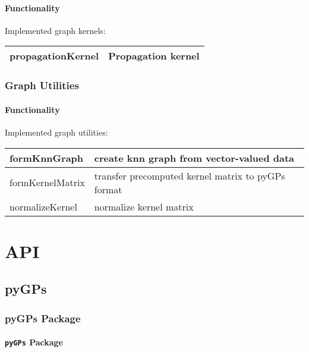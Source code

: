 \documentclass[letterpaper,10pt,english]{sphinxmanual}
\begin{document}
\subsubsection{Functionality}
\label{Graph:id2}
Implemented graph kernels:

\begin{tabulary}{\linewidth}{|L|L|}
\hline

propagationKernel
 & 
Propagation kernel
\\\hline
\end{tabulary}



\subsection{Graph Utilities}
\label{Graph:graph-utilities}

\subsubsection{Functionality}
\label{Graph:id3}
Implemented graph utilities:

\begin{tabulary}{\linewidth}{|L|L|}
\hline

formKnnGraph
 & 
create knn graph from vector-valued data
\\\hline

formKernelMatrix
 & 
transfer precomputed kernel matrix to pyGPs format
\\\hline

normalizeKernel
 & 
normalize kernel matrix
\\\hline
\end{tabulary}



\chapter{API}
\label{index:api}

\section{pyGPs}
\label{modules:pygps}\label{modules::doc}

\subsection{pyGPs Package}
\label{pyGPs::doc}\label{pyGPs:pygps-package}

\subsubsection{\texttt{pyGPs} Package}
\label{pyGPs:id1}\label{pyGPs:module-pyGPs.__init__}
\end{document}

